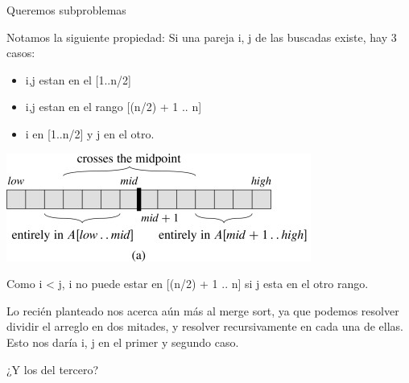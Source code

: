 \documentclass[pdf]{beamer}
\begin{document}
\begin{frame}{Queremos subproblemas}
    
    Notamos la siguiente propiedad: Si una pareja i, j de las buscadas existe, hay 3 casos:
    \begin{itemize}
	\item i,j estan en el [1..n/2]
	\item i,j estan en el rango [(n/2) + 1 .. n]
	\item i en [1..n/2] y j en el otro.
    \end{itemize}
    
    \includegraphics[scale=2.5]{img/subarrays-casos.jpg}
    
    Como i < j, i no puede estar en [(n/2) + 1 .. n] si j esta en el otro rango. 
    
\end{frame}

\begin{frame}
    Lo recién planteado nos acerca aún más al merge sort, ya que podemos resolver dividir el arreglo
    en dos mitades, y resolver recursivamente en cada una de ellas. Esto nos daría i, j en el primer y segundo caso.
    
    
    ¿Y los del tercero?
    
    
\end{frame}
\end{document}
